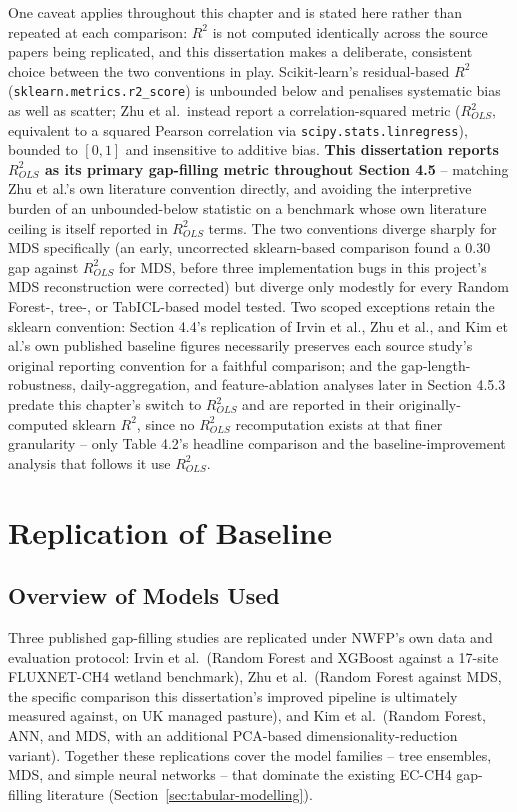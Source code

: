 One caveat applies throughout this chapter and is stated here rather than repeated at each
comparison: $R^2$ is not computed identically across the source papers being replicated, and this
dissertation makes a deliberate, consistent choice between the two conventions in play.
Scikit-learn's residual-based $R^2$ (\texttt{sklearn.metrics.r2\_score}) is unbounded below and
penalises systematic bias as well as scatter; Zhu et al.\ instead report a correlation-squared
metric ($R^2_{OLS}$, equivalent to a squared Pearson correlation via
\texttt{scipy.stats.linregress}), bounded to $[0,1]$ and insensitive to additive bias. \textbf{This
dissertation reports $R^2_{OLS}$ as its primary gap-filling metric throughout Section 4.5} --
matching Zhu et al.'s own literature convention directly, and avoiding the interpretive burden of an
unbounded-below statistic on a benchmark whose own literature ceiling is itself reported in $R^2_{OLS}$
terms. The two conventions diverge sharply for MDS specifically (an early, uncorrected sklearn-based
comparison found a 0.30 gap against $R^2_{OLS}$ for MDS, before three implementation bugs in this
project's MDS reconstruction were corrected) but diverge only modestly for every Random Forest-,
tree-, or TabICL-based model tested. Two scoped exceptions retain the sklearn convention: Section 4.4's
replication of Irvin et al., Zhu et al., and Kim et al.'s own published baseline figures necessarily
preserves each source study's original reporting convention for a faithful comparison; and the
gap-length-robustness, daily-aggregation, and feature-ablation analyses later in Section 4.5.3 predate
this chapter's switch to $R^2_{OLS}$ and are reported in their originally-computed sklearn $R^2$,
since no $R^2_{OLS}$ recomputation exists at that finer granularity -- only Table 4.2's headline
comparison and the baseline-improvement analysis that follows it use $R^2_{OLS}$.

\section{Replication of Baseline}

\subsection{Overview of Models Used}

Three published gap-filling studies are replicated under NWFP's own data and evaluation protocol:
Irvin et al.\ (Random Forest and XGBoost against a 17-site FLUXNET-CH4 wetland benchmark), Zhu et
al.\ (Random Forest against MDS, the specific comparison this dissertation's improved pipeline is
ultimately measured against, on UK managed pasture), and Kim et al.\ (Random Forest, ANN, and MDS,
with an additional PCA-based dimensionality-reduction variant). Together these replications cover
the model families -- tree ensembles, MDS, and simple neural networks -- that dominate the existing
EC-CH4 gap-filling literature (Section~\ref{sec:tabular-modelling}).

